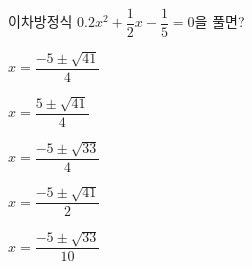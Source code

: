 이차방정식 $0.2x^2+\dfrac{1}{2}x-\dfrac{1}{5}=0$을 풀면?
\begin{choicesii}{\rule[-3ex]{0pt}{8ex}$x=\dfrac{-5\pm\sqrt{41}}{4}$}{\rule[-3ex]{0pt}{8ex}$x=\dfrac{5\pm\sqrt{41}}{4}$}{\rule[-3ex]{0pt}{8ex}$x=\dfrac{-5\pm\sqrt{33}}{4}$}{\rule[-3ex]{0pt}{8ex}$x=\dfrac{-5\pm\sqrt{41}}{2}$}{\rule[-3ex]{0pt}{8ex}$x=\dfrac{-5\pm\sqrt{33}}{10}$}\end{choicesii}
